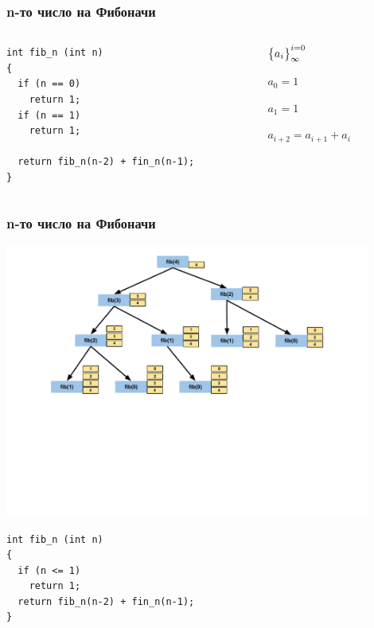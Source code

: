 \documentclass{beamer}
\begin{document}
\begin{frame}[fragile]
\frametitle{n-то число на Фибоначи}


\begin{columns}[t]
  \begin{column}{0.7\textwidth}

\begin{lstlisting}
int fib_n (int n)
{
  if (n == 0)
    return 1;
  if (n == 1)
    return 1;

  return fib_n(n-2) + fin_n(n-1);
}
\end{lstlisting}


  \end{column}
  \begin{column}{0.3\textwidth}
\begin{flushleft}

  $\big{\{}a_i\big{\}}_\infty^{i=0}$

  \vspace{10px}

  $a_0 = 1$

  $a_1 = 1$

  $a_{i+2} = a_{i+1} + a_i$


\end{flushleft}
  \end{column}
\end{columns}

\end{frame}



\begin{frame}[fragile]
\frametitle{n-то число на Фибоначи}

\includegraphics[width=12cm]{images/fib_stack}

\vspace{-100px}

\begin{flushleft}
\begin{lstlisting}
int fib_n (int n)
{
  if (n <= 1)
    return 1;
  return fib_n(n-2) + fin_n(n-1);
}
\end{lstlisting}
\end{flushleft}


\end{frame}
\end{document}
